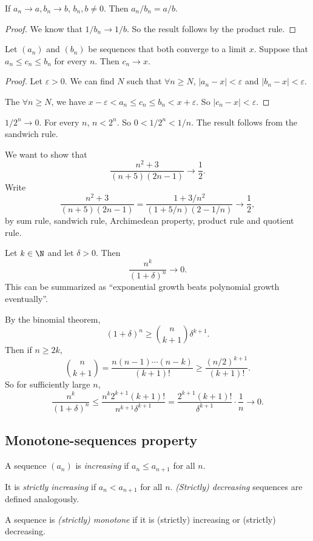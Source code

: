 \documentclass[a4paper]{article}
\begin{document}
\begin{cor}
  If $a_n \to a, b_n \to b$, $b_n, b\not= 0$. Then $a_n/b_n = a/b$.
\end{cor}

\begin{proof}
  We know that $1/b_n \to 1/b$. So the result follows by the product rule.
\end{proof}

\begin{lemma}
  Let $(a_n)$ and $(b_n)$ be sequences that both converge to a limit $x$. Suppose that $a_n \leq c_n \leq b_n$ for every $n$. Then $c_n \to x$.
\end{lemma}

\begin{proof}
  Let $\varepsilon > 0$. We can find $N$ such that $\forall n \geq N$, $|a_n - x| < \varepsilon$ and $|b_n - x| < \varepsilon$.

  The $\forall n\geq N$, we have $x - \varepsilon < a_n \leq c_n \leq b_n < x + \varepsilon$. So $|c_n - x| < \varepsilon$.
\end{proof}

\begin{eg}
  $1/2^n \to 0$. For every $n$, $n < 2^n$. So $0 < 1/2^n < 1/n$. The result follows from the sandwich rule.
\end{eg}
\begin{eg}
  We want to show that
  \[
    \frac{n^2 + 3}{(n + 5)(2n - 1)} \to \frac{1}{2}.
  \]
  Write
  \[
    \frac{n^2 + 3}{(n + 5)(2n - 1)} = \frac{1 + 3/n^2}{(1 + 5/n)(2 - 1/n)} \to \frac{1}{2},
  \]
  by sum rule, sandwich rule, Archimedean property, product rule and quotient rule.
\end{eg}

\begin{eg}
  Let $k\in \N$ and let $\delta > 0$. Then
  \[
    \frac{n^k}{(1 + \delta)^n}\to 0.
  \]
  This can be summarized as ``exponential growth beats polynomial growth eventually''.

  By the binomial theorem,
  \[
    (1 + \delta)^n \geq \binom{n}{k + 1}\delta^{k + 1}.
  \]
  Then if $n\geq 2k$,
  \[
    \binom{n}{k + 1} = \frac{n(n - 1)\cdots(n - k)}{(k + 1)!} \geq \frac{(n/2)^{k + 1}}{(k + 1)!}.
  \]
  So for sufficiently large $n$,
  \[
    \frac{n^k}{(1 + \delta)^n} \leq \frac{n^k 2^{k + 1} (k+1)!}{n^{k + 1}\delta^{k + 1}} = \frac{2^{k + 1} (k + 1)!}{\delta^{k + 1}} \cdot \frac{1}{n} \to 0.
  \]
\end{eg}

\subsection{Monotone-sequences property}
\begin{defi}
  A sequence $(a_n)$ is \emph{increasing} if $a_n\leq a_{n + 1}$ for all $n$.

  It is \emph{strictly increasing} if $a_n < a_{n + 1}$ for all $n$. \emph{(Strictly) decreasing} sequences are defined analogously.

  A sequence is \emph{(strictly) monotone} if it is (strictly) increasing or (strictly) decreasing.
\end{defi}
\end{document}
